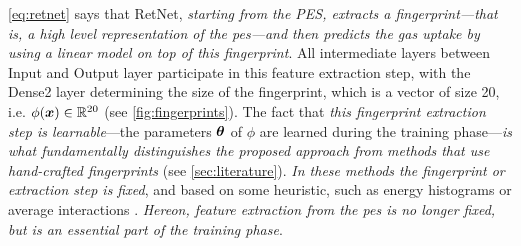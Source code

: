\Equation{} \ref{eq:retnet} says that RetNet, \emph{starting from the PES,
extracts a fingerprint---that is, a high level
representation of the \gls{pes}---and then
predicts the gas uptake by using a linear model on top of this fingerprint}. All
intermediate layers between Input and Output layer
participate in this feature extraction step, with the Dense\num{2} layer
determining the size of the fingerprint, which is a vector of size \num{20},
i.e. $\phi(\boldsymbol{x}) \in \mathbb{R}^{20}$ (see \Figure{} \ref{fig:fingerprints}). The
fact that \emph{this fingerprint extraction step
is learnable}---the parameters $\boldsymbol{\theta}$ of $\phi$ are learned during the training
phase---\emph{is what fundamentally distinguishes the
proposed approach from methods that use hand-crafted
fingerprints} (see \Section{}
\ref{sec:literature}). \emph{In these methods the fingerprint or
extraction step is fixed}, and based on some
heuristic, such as energy histograms \parencite{bucior} or average interactions
\parencite{generic}. \emph{Hereon, feature extraction from the \gls{pes} is no
longer fixed, but is an essential part of the training phase}.

